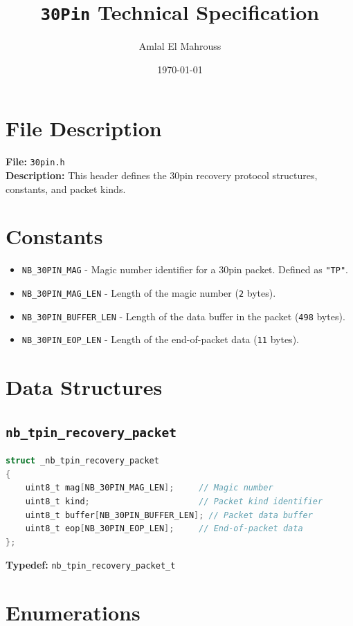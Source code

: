 \documentclass{article}
\title{\texttt{30Pin} Technical Specification}
\author{Amlal El Mahrouss}
\date{\today}
\begin{document}
\maketitle

\section*{File Description}
\textbf{File:} \texttt{30pin.h} \\
\textbf{Description:} This header defines the 30pin recovery protocol structures, constants, and packet kinds.

\section{Constants}
\begin{itemize}[leftmargin=2em]
    \item \texttt{NB\_30PIN\_MAG} - Magic number identifier for a 30pin packet. Defined as \texttt{"TP"}.
    \item \texttt{NB\_30PIN\_MAG\_LEN} - Length of the magic number (\texttt{2} bytes).
    \item \texttt{NB\_30PIN\_BUFFER\_LEN} - Length of the data buffer in the packet (\texttt{498} bytes).
    \item \texttt{NB\_30PIN\_EOP\_LEN} - Length of the end-of-packet data (\texttt{11} bytes).
\end{itemize}

\section{Data Structures}
\subsection{\texttt{nb\_tpin\_recovery\_packet}}
\begin{lstlisting}[language=C]
struct _nb_tpin_recovery_packet
{
    uint8_t mag[NB_30PIN_MAG_LEN];     // Magic number
    uint8_t kind;                      // Packet kind identifier
    uint8_t buffer[NB_30PIN_BUFFER_LEN]; // Packet data buffer
    uint8_t eop[NB_30PIN_EOP_LEN];     // End-of-packet data
};
\end{lstlisting}

\textbf{Typedef:} \texttt{nb\_tpin\_recovery\_packet\_t}

\section{Enumerations}
\end{document}
